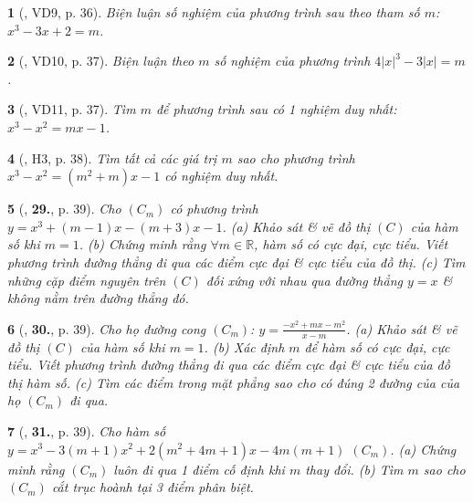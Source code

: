 \documentclass{article}
\newtheorem{baitoan}{}
\begin{document}
\begin{baitoan}[\cite{TLCT_giai_tich_12}, VD9, p. 36]
	Biện luận số nghiệm của phương trình sau theo tham số $m$: $x^3 - 3x + 2 = m$.
\end{baitoan}

\begin{baitoan}[\cite{TLCT_giai_tich_12}, VD10, p. 37]
	Biện luận theo $m$ số nghiệm của phương trình $4|x|^3 - 3|x| = m$.
\end{baitoan}

\begin{baitoan}[\cite{TLCT_giai_tich_12}, VD11, p. 37]
	Tìm $m$ để phương trình sau có 1 nghiệm duy nhất: $x^3 - x^2 = mx - 1$.
\end{baitoan}

\begin{baitoan}[\cite{TLCT_giai_tich_12}, H3, p. 38]
	Tìm tất cả các giá trị $m$ sao cho phương trình $x^3 - x^2 = (m^2 + m)x - 1$ có nghiệm duy nhất.
\end{baitoan}

\begin{baitoan}[\cite{TLCT_giai_tich_12}, \textbf{29.}, p. 39]
	Cho $(C_m)$ có phương trình $y = x^3 + (m - 1)x - (m + 3)x - 1$. (a) Khảo sát \& vẽ đồ thị $(C)$ của hàm số khi $m = 1$. (b) Chứng minh rằng $\forall m\in\mathbb{R}$, hàm số có cực đại, cực tiểu. Viết phương trình đường thẳng đi qua các điểm cực đại \& cực tiểu của đồ thị. (c) Tìm những cặp điểm nguyên trên $(C)$ đối xứng với nhau qua đường thẳng $y = x$ \& không nằm trên đường thẳng đó.	
\end{baitoan}

\begin{baitoan}[\cite{TLCT_giai_tich_12}, \textbf{30.}, p. 39]
	Cho họ đường cong $(C_m)$: $y = \frac{-x^2 + mx - m^2}{x - m}$. (a) Khảo sát \& vẽ đồ thị $(C)$ của hàm số khi $m = 1$. (b) Xác định $m$ để hàm số có cực đại, cực tiểu. Viết phương trình đường thẳng đi qua các điểm cực đại \& cực tiểu của đồ thị hàm số. (c) Tìm các điểm trong mặt phẳng sao cho có đúng 2 đường của của họ $(C_m)$ đi qua.	
\end{baitoan}

\begin{baitoan}[\cite{TLCT_giai_tich_12}, \textbf{31.}, p. 39]
	Cho hàm số $y = x^3 - 3(m + 1)x^2 + 2(m^2 + 4m + 1)x - 4m(m + 1)$ $(C_m)$. (a) Chứng minh rằng $(C_m)$ luôn đi qua 1 điểm cố định khi $m$ thay đổi. (b) Tìm $m$ sao cho $(C_m)$ cắt trục hoành tại 3 điểm phân biệt.	
\end{baitoan}
\end{document}
